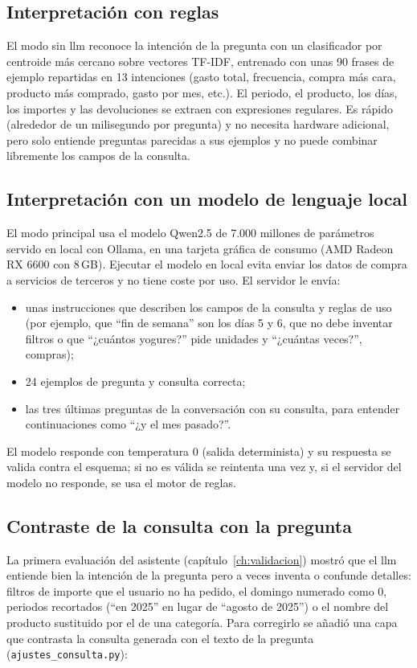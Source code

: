 \subsection{Interpretación con reglas}
El modo sin \gls{llm} reconoce la intención de la pregunta con un clasificador por centroide más cercano sobre vectores TF-IDF, entrenado con unas 90 frases de ejemplo repartidas en 13 intenciones (gasto total, frecuencia, compra más cara, producto más comprado, gasto por mes, etc.). El periodo, el producto, los días, los importes y las devoluciones se extraen con expresiones regulares. Es rápido (alrededor de un milisegundo por pregunta) y no necesita hardware adicional, pero solo entiende preguntas parecidas a sus ejemplos y no puede combinar libremente los campos de la consulta.

\subsection{Interpretación con un modelo de lenguaje local}
\label{s:llm}
El modo principal usa el modelo Qwen2.5 de 7.000 millones de parámetros \parencite{qwen2024qwen25} servido en local con Ollama, en una tarjeta gráfica de consumo (AMD Radeon RX 6600 con 8\,GB). Ejecutar el modelo en local evita enviar los datos de compra a servicios de terceros y no tiene coste por uso. El servidor le envía:

\begin{itemize}
    \item unas instrucciones que describen los campos de la consulta y reglas de uso (por ejemplo, que \enquote{fin de semana} son los días 5 y 6, que no debe inventar filtros o que \enquote{¿cuántos yogures?} pide unidades y \enquote{¿cuántas veces?}, compras);
    \item 24 ejemplos de pregunta y consulta correcta;
    \item las tres últimas preguntas de la conversación con su consulta, para entender continuaciones como \enquote{¿y el mes pasado?}.
\end{itemize}

El modelo responde con temperatura 0 (salida determinista) y su respuesta se valida contra el esquema; si no es válida se reintenta una vez y, si el servidor del modelo no responde, se usa el motor de reglas.

\subsection{Contraste de la consulta con la pregunta}
\label{s:grounding}
La primera evaluación del asistente (capítulo~\ref{ch:validacion}) mostró que el \gls{llm} entiende bien la intención de la pregunta pero a veces inventa o confunde detalles: filtros de importe que el usuario no ha pedido, el domingo numerado como 0, periodos recortados (\enquote{en 2025} en lugar de \enquote{agosto de 2025}) o el nombre del producto sustituido por el de una categoría. Para corregirlo se añadió una capa que contrasta la consulta generada con el texto de la pregunta (\texttt{ajustes\_consulta.py}):

